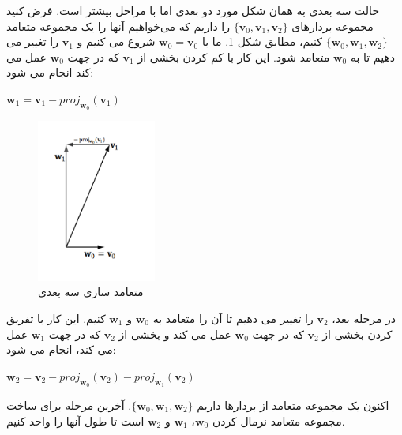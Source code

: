 {\begin{spacing}{1.5}
        حالت سه بعدی به همان شکل مورد دو بعدی اما با مراحل بیشتر است.
        فرض کنید مجموعه بردارهای $\{\textbf{v}_{0},\textbf{v}_{1},\textbf{v}_{2}\}$ را داریم که می‌خواهیم آنها را یک مجموعه متعامد $\{\textbf{w}_{0},\textbf{w}_{1},\textbf{w}_{2}\}$ کنیم، مطابق شکل \ref{fig:4.Session.1.1.12}.
        ما با $\textbf{w}_{0}=\textbf{v}_{0}$ شروع می کنیم و $\textbf{v}_{1}$ را تغییر می دهیم تا به $\textbf{w}_{0}$ متعامد شود.
        این کار با کم کردن بخشی از $\textbf{v}_{1}$ که در جهت $\textbf{w}_{0}$ عمل می کند انجام می شود:

        \begin{center}
            $\textbf{w}_{1}=\textbf{v}_{1}-proj_{\textbf{w}_{0}}(\textbf{v}_{1})$
        \end{center}

        \begin{figure}[H]
            \centering
            \setlength{\belowcaptionskip}{-10pt}
            \includegraphics[width=0.35\textwidth]{Images/4/4.Session.1.1.12}
            \caption{متعامد سازی سه بعدی}
            \label{fig:4.Session.1.1.12}
        \end{figure}

        در مرحله بعد، $\textbf{v}_{2}$ را تغییر می دهیم تا آن را متعامد به $\textbf{w}_{0}$ و $\textbf{w}_{1}$ کنیم.
        این کار با تفریق کردن بخشی از $\textbf{v}_{2}$ که در جهت $\textbf{w}_{0}$ عمل می کند و بخشی از $\textbf{v}_{2}$ که در جهت $\textbf{w}_{1}$ عمل می کند، انجام می شود:

        \begin{center}
            $\textbf{w}_{2}=\textbf{v}_{2}-proj_{\textbf{w}_{0}}(\textbf{v}_{2})-proj_{\textbf{w}_{1}}(\textbf{v}_{2})$
        \end{center}

        اکنون یک مجموعه متعامد از بردارها داریم $\{\textbf{w}_{0},\textbf{w}_{1},\textbf{w}_{2}\}$.
        آخرین مرحله برای ساخت مجموعه متعامد نرمال کردن $\textbf{w}_{0}$، $\textbf{w}_{1}$ و $\textbf{w}_{2}$ است تا طول آنها را واحد کنیم.


\end{spacing}}
